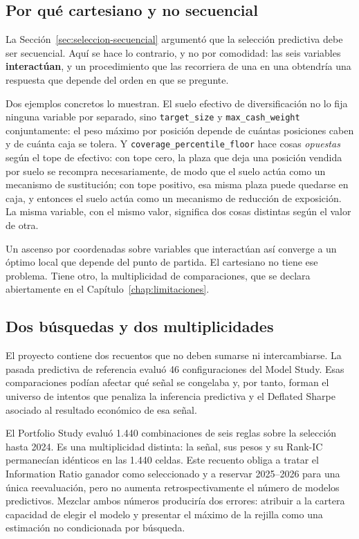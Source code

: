 \subsection*{Por qué cartesiano y no secuencial}

La Sección~\ref{sec:seleccion-secuencial} argumentó que la selección predictiva debe ser secuencial.
Aquí se hace lo contrario, y no por comodidad: las seis variables \textbf{interactúan},
y un procedimiento que las recorriera de una en una obtendría una respuesta que depende del orden en
que se pregunte.

Dos ejemplos concretos lo muestran. El suelo efectivo de diversificación no lo fija ninguna variable
por separado, sino \texttt{target\_\allowbreak size} y \texttt{max\_cash\_\allowbreak weight} conjuntamente: el peso
máximo por posición depende de cuántas posiciones caben y de cuánta caja se tolera. Y
\texttt{coverage\_percentile\_\allowbreak floor} hace cosas \emph{opuestas} según el tope de efectivo: con
tope cero, la plaza que deja una posición vendida por suelo se recompra necesariamente, de modo que
el suelo actúa como un mecanismo de sustitución; con tope positivo, esa misma plaza puede quedarse
en caja, y entonces el suelo actúa como un mecanismo de reducción de exposición. La misma variable,
con el mismo valor, significa dos cosas distintas según el valor de otra.

Un ascenso por coordenadas sobre variables que interactúan así converge a un óptimo local que
depende del punto de partida. El cartesiano no tiene ese problema. Tiene otro, la multiplicidad de
comparaciones, que se declara abiertamente en el Capítulo~\ref{chap:limitaciones}.

\subsection{Dos búsquedas y dos multiplicidades}
\label{sec:dos-multiplicidades}

El proyecto contiene dos recuentos que no deben sumarse ni intercambiarse. La pasada predictiva de
referencia evaluó 46 configuraciones del Model Study. Esas comparaciones podían afectar qué señal
se congelaba y, por tanto, forman el universo de intentos que penaliza la inferencia predictiva y el
Deflated Sharpe asociado al resultado económico de esa señal.

El Portfolio Study evaluó 1.440 combinaciones de seis reglas sobre la selección hasta 2024. Es una
multiplicidad distinta: la señal, sus pesos y su Rank-IC permanecían idénticos en las 1.440 celdas.
Este recuento obliga a tratar el Information Ratio ganador como seleccionado y a reservar
2025--2026 para una única reevaluación, pero no aumenta retrospectivamente el número de modelos
predictivos. Mezclar ambos números produciría dos errores: atribuir a la cartera capacidad de elegir
el modelo y presentar el máximo de la rejilla como una estimación no condicionada por búsqueda.

